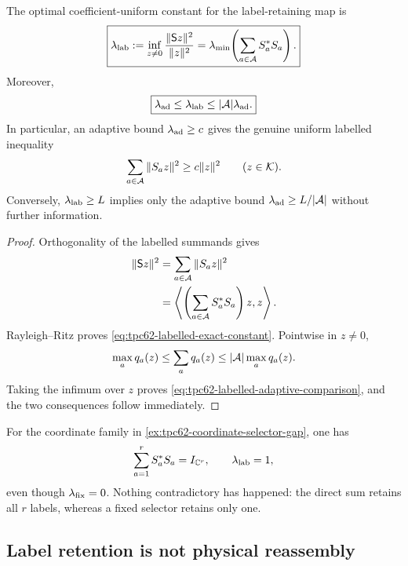 \begin{theorem}
\label{thm:tpc62-labeled-uniformization}
The optimal coefficient-uniform constant for the label-retaining map is
\begin{equation}
 \boxed{
 \lambda_{\rm lab}
 :=\inf_{z\ne0}\frac{\|\mathsf Sz\|^2}{\|z\|^2}
 =\lambda_{\min}\!\left(\sum_{a\in\mathcal A}S_a^*S_a\right).}
 \label{eq:tpc62-labelled-exact-constant}
\end{equation}
Moreover,
\begin{equation}
 \boxed{
 \lambda_{\rm ad}\le\lambda_{\rm lab}
 \le |\mathcal A|\lambda_{\rm ad}.}
 \label{eq:tpc62-labelled-adaptive-comparison}
\end{equation}
In particular, an adaptive bound \(\lambda_{\rm ad}\ge c\) gives the
genuine uniform labelled inequality
\begin{equation}
 \sum_{a\in\mathcal A}\|S_az\|^2\ge c\|z\|^2
 \qquad(z\in\mathcal K).
 \label{eq:tpc62-labelled-uniform-lower}
\end{equation}
Conversely, \(\lambda_{\rm lab}\ge L\) implies only the adaptive bound
\(\lambda_{\rm ad}\ge L/|\mathcal A|\) without further information.
\end{theorem}

\begin{proof}
Orthogonality of the labelled summands gives
\begin{align*}
 \|\mathsf Sz\|^2
 &=\sum_{a\in\mathcal A}\|S_az\|^2\\
 &=\left\langle
     \left(\sum_{a\in\mathcal A}S_a^*S_a\right)z,z
   \right\rangle.
\end{align*}
Rayleigh--Ritz proves \eqref{eq:tpc62-labelled-exact-constant}.  Pointwise
in \(z\ne0\),
\[
 \max_a q_a(z)
 \le\sum_a q_a(z)
 \le |\mathcal A|\max_a q_a(z).
\]
Taking the infimum over \(z\) proves
\eqref{eq:tpc62-labelled-adaptive-comparison}, and the two consequences
follow immediately.
\end{proof}

For the coordinate family in
\cref{ex:tpc62-coordinate-selector-gap}, one has
\[
 \sum_{a=1}^rS_a^*S_a=I_{\mathbb C^r},
 \qquad
 \lambda_{\rm lab}=1,
\]
even though \(\lambda_{\rm fix}=0\).  Nothing contradictory has happened:
the direct sum retains all \(r\) labels, whereas a fixed selector retains
only one.

\subsection{Label retention is not physical reassembly}

